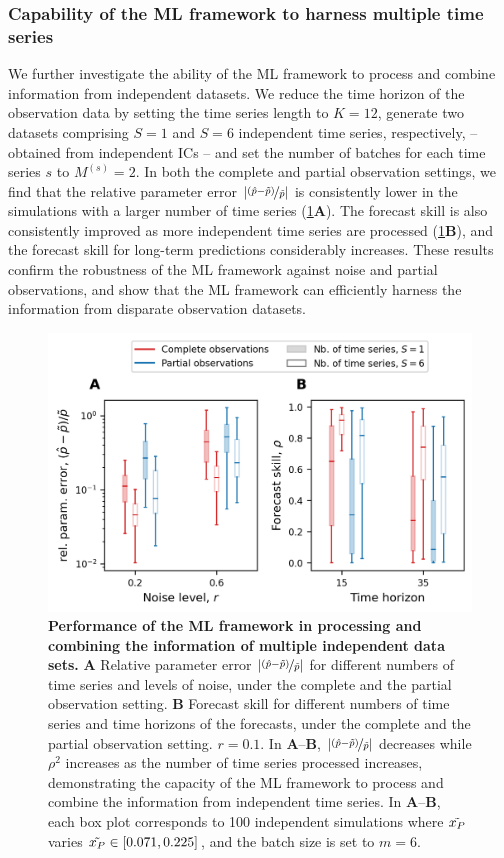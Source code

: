 \subsubsection{Capability of the ML framework to harness multiple time series}
We further investigate the ability of the ML framework to process and combine information from independent datasets. 
%
We reduce the time horizon of the observation data by setting the time series length to $K = 12$, generate two datasets comprising $S = 1$ and $S=6$ independent time series, respectively, -- obtained from independent ICs -- and set the number of batches for each time series $s$ to $M^{(s)} = 2$. In both the complete and partial observation settings, we find that the relative parameter error $|\nicefrac{(\hat p -\Tilde{p})}{\Tilde{p}}|$ is consistently lower in the simulations with a larger number of time series (\cref{fig:perfect_setting_multiple_TS}\textbf{A}). The forecast skill is also consistently improved as more independent time series are processed (\cref{fig:perfect_setting_multiple_TS}\textbf{B}), and the forecast skill for long-term predictions considerably increases.
These results confirm the robustness of the ML framework against noise and partial observations, and show that the ML framework can efficiently harness the information from disparate observation datasets.
%

\begin{figure}[ht]
    \centering
    \includegraphics[]{figures/figure4.png}
    \caption{\textbf{Performance of the ML framework in processing and combining the information of multiple independent data sets.}
    \textbf{A} Relative parameter error $|\nicefrac{(\hat p -\Tilde{p})}{\Tilde{p}}|$ for different numbers of time series and levels of noise, under the complete and the partial observation setting. 
    \textbf{B} Forecast skill for different numbers of time series and time horizons of the forecasts, under the complete and the partial observation setting. $r = 0.1$.
    In \textbf{A}--\textbf{B}, $|\nicefrac{(\hat p -\Tilde{p})}{\Tilde{p}}|$ decreases while $\rho^2$ increases as the number of time series processed increases, demonstrating the capacity of the ML framework to process and combine the information from independent time series.
    In \textbf{A}--\textbf{B}, each box plot corresponds to 100 independent simulations where $\Tilde{x_P}$ varies $\Tilde{x_P} \in [0.071, 0.225]$, and the batch size is set to $m = 6$.
    }
    \label{fig:perfect_setting_multiple_TS}
\end{figure}
\FloatBarrier

